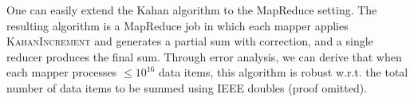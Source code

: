 
One can easily extend the Kahan algorithm to the MapReduce setting. 
The resulting algorithm %
is a MapReduce job in which each mapper applies \textsc{KahanIncrement} and generates a partial sum with correction, and a single reducer produces the final sum. %
Through error analysis, we can derive that when each mapper processes $\leq 10^{16}$ data items, this algorithm is robust w.r.t. the total number of data items to be summed using IEEE doubles (proof omitted). 


